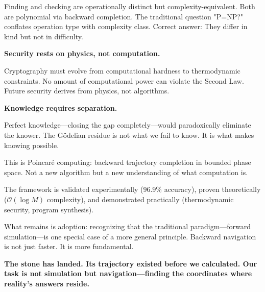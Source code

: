 \documentclass[twocolumn,10pt]{article}
\theoremstyle{definition}
\theoremstyle{remark}
\newcommand{\bigO}{\mathcal{O}}
\begin{document}
Finding and checking are operationally distinct but complexity-equivalent. Both are polynomial via backward completion. The traditional question "P=NP?" conflates operation type with complexity class. Correct answer: They differ in kind but not in difficulty.

\vspace{0.2cm}
\noindent\textbf{Security rests on physics, not computation.}

Cryptography must evolve from computational hardness to thermodynamic constraints. No amount of computational power can violate the Second Law. Future security derives from physics, not algorithms.

\vspace{0.2cm}
\noindent\textbf{Knowledge requires separation.}

Perfect knowledge—closing the gap completely—would paradoxically eliminate the knower. The Gödelian residue is not what we fail to know. It is what makes knowing possible.

\vspace{0.2cm}
\noindent This is Poincaré computing: backward trajectory completion in bounded phase space. Not a new algorithm but a new understanding of what computation is.

\vspace{0.2cm}
\noindent The framework is validated experimentally (96.9\% accuracy), proven theoretically ($\bigO(\log M)$ complexity), and demonstrated practically (thermodynamic security, program synthesis).

\vspace{0.2cm}
\noindent What remains is adoption: recognizing that the traditional paradigm—forward simulation—is one special case of a more general principle. Backward navigation is not just faster. It is more fundamental.

\vspace{0.2cm}
\noindent\textbf{The stone has landed. Its trajectory existed before we calculated. Our task is not simulation but navigation—finding the coordinates where reality's answers reside.}



\end{document}
